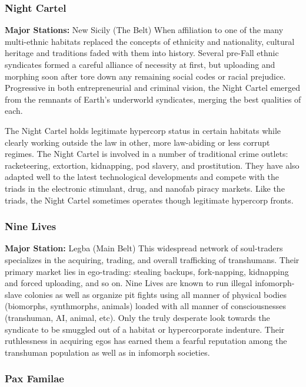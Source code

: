 \subsubsection{Night Cartel}

\textbf{Major Stations:} New Sicily (The Belt)
When affiliation to one of the many multi-ethnic 
habitats replaced the concepts of ethnicity and nationality, cultural heritage and traditions faded with 
them into history. Several pre-Fall ethnic syndicates 
formed a careful alliance of necessity at first,  but 
uploading and morphing soon after tore down any 
remaining social codes or racial prejudice. Progressive in both entrepreneurial and criminal vision, the 
Night Cartel emerged from the remnants of Earth's 
underworld syndicates, merging the best qualities 
of each.

The Night Cartel holds legitimate hypercorp status 
in certain habitats while clearly working outside 
the law in other, more law-abiding or less corrupt 
regimes. The Night Cartel is involved in a number 
of traditional crime outlets: racketeering, extortion, 
kidnapping, pod slavery, and prostitution. They have 
also adapted well to the latest technological developments and compete with the triads in the electronic 
stimulant, drug, and nanofab piracy markets. Like the 
triads, the Night Cartel sometimes operates though 
legitimate hypercorp fronts.

\subsubsection{Nine Lives}

\textbf{Major Station:} Legba (Main Belt)
This widespread network of soul-traders specializes 
in the acquiring, trading, and overall trafficking of 
transhumans. Their primary market lies in ego-trading: stealing backups, fork-napping, kidnapping and 
forced uploading, and so on. Nine Lives are known 
to run illegal infomorph-slave colonies as well as 
organize pit fights using all manner of physical 
bodies (biomorphs, synthmorphs, animals) loaded 
with all manner of consciousnesses (transhuman, 
AI, animal, etc). Only the truly desperate look towards the syndicate to be smuggled out of a habitat 
or hypercorporate indenture. Their ruthlessness in 
acquiring egos has earned them a fearful reputation 
among the transhuman population as well as in 
infomorph societies.

\subsubsection{Pax Familae}

